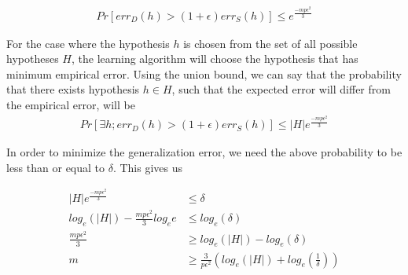 \begin{enumerate}
\begin{equation*}
\begin{aligned}
Pr \left[ err_D (h) > (1+\epsilon) err_S(h) \right ] \leq e^{\frac{-mp\epsilon^2}{3}}
\end{aligned}
\end{equation*}

For the case where the hypothesis $h$ is chosen from the set of all possible hypotheses $H$, the learning algorithm will choose the hypothesis that has minimum empirical error. Using the union bound, we can say that the probability that there exists hypothesis $h \in H$, such that the expected error will differ from the empirical error, will be
\begin{equation*}
\begin{aligned}
Pr \left[\exists h; err_D (h) > (1+\epsilon) err_S(h) \right ] \leq \left | H \right | e^{\frac{-mp\epsilon^2}{3}}
\end{aligned}
\end{equation*}

In order to minimize the generalization error, we need the above probability to be less than or equal to $\delta$. This gives us

\begin{equation*}
\begin{aligned}
\left | H \right | e^{\frac{-mp\epsilon^2}{3}} &\leq \delta\\
log_e \left ( \left | H \right | \right ) - \frac{mp\epsilon^2}{3} log_e e &\leq log_e \left (\delta \right)\\
\frac{mp\epsilon^2}{3} &\geq log_e \left ( \left | H \right | \right ) - log_e \left (\delta \right)\\
m &\geq \frac{3}{p\epsilon^2} \left ( log_e \left ( \left | H \right | \right ) + log_e \left (\frac{1}{\delta} \right) \right )
\end{aligned}
\end{equation*}

\end{enumerate}

